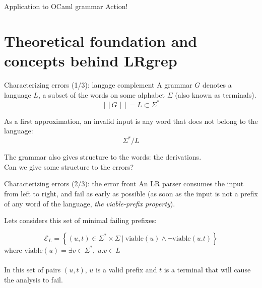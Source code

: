 \documentclass{beamer}          %
\begin{document}
%
%

\begin{frame}{Application to OCaml grammar}
  Action!
\end{frame}

\section{Theoretical foundation and concepts behind LRgrep}

\begin{frame}{Characterizing errors (1/3): langage complement}
  A grammar $G$ denotes a language $L$, a subset of the words on some alphabet $\Sigma$ (also known as terminals).
  $$
  [\![G\,]\!] = L \subset \Sigma^*
  $$

  \pause
  As a first approximation, an invalid input is any word that does not belong to the language:
  $$
  \Sigma^* / L
  $$

  \pause
  The grammar also gives structure to the words: the derivations.
  \\
  Can we give some structure to the errors?
\end{frame}

\begin{frame}{Characterizing errors (2/3): the error front}
  An LR parser consumes the input from left to right, and fail as early as possible (as soon as the input is not a prefix of any word of the language, {\em the viable-prefix property}).


  \pause
  Lets considers this set of minimal failing prefixes:

  $$
  \mathcal E_L = \left\{ (u, t) \in \Sigma^*\times\Sigma\ \big|\
    \text{viable}(u) \wedge \neg \text{viable}(u.t)
  \right\}
  $$
  \qquad where $\text{viable}(u) = \exists v \in \Sigma^*,\ u.v \in L$
  \pause
  \\ \ \\
  In this set of pairs $(u,t)$, $u$ is a valid prefix and $t$ is a terminal that will cause the analysis to fail.
\end{frame}
\end{document}
